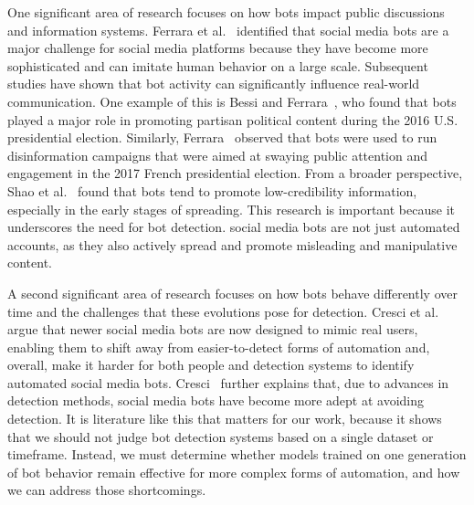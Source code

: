 One significant area of research focuses on how bots impact public discussions and information systems. Ferrara et al.~\cite{ferrara2016rise} identified that social media bots are a major challenge for social media platforms because they have become more sophisticated and can imitate human behavior on a large scale. Subsequent studies have shown that bot activity can significantly influence real-world communication. One example of this is Bessi and Ferrara~\cite{bessi2016distort}, who found that bots played a major role in promoting partisan political content during the 2016 U.S. presidential election. Similarly, Ferrara~\cite{ferrara2017french} observed that bots were used to run disinformation campaigns that were aimed at swaying public attention and engagement in the 2017 French presidential election. From a broader perspective, Shao et al.~\cite{shao2018spread} found that bots tend to promote low-credibility information, especially in the early stages of spreading. This research is important because it underscores the need for bot detection. social media bots are not just automated accounts, as they also actively spread and promote misleading and manipulative content.

A second significant area of research focuses on how bots behave differently over time and the challenges that these evolutions pose for detection. Cresci et al.~\cite{cresci2017paradigm} argue that newer social media bots are now designed to mimic real users, enabling them to shift away from easier-to-detect forms of automation and, overall, make it harder for both people and detection systems to identify automated social media bots. Cresci~\cite{cresci2020decade} further explains that, due to advances in detection methods, social media bots have become more adept at avoiding detection. It is literature like this that matters for our work, because it shows that we should not judge bot detection systems based on a single dataset or timeframe. Instead, we must determine whether models trained on one generation of bot behavior remain effective for more complex forms of automation, and how we can address those shortcomings.


